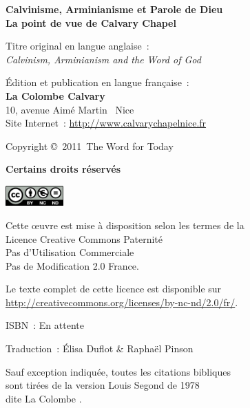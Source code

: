 \newpage
\mbox{}
\vfill

{\scriptsize

{\bfseries Calvinisme, Arminianisme et Parole de Dieu\\
La point de vue de Calvary Chapel}

Titre original en langue anglaise~:\\
\emph{Calvinism, Arminianism and the Word of God}

Édition et publication en langue française~:\\
{\bfseries La Colombe Calvary}\\
10, avenue Aimé Martin ~Nice\\
Site Internet~: \url{http://www.calvarychapelnice.fr}

Copyright \copyright{}~2011~The Word for Today

{\bfseries Certains droits réservés}

\includegraphics[width=6em]{by-nc-nd_eu}

Cette \oe{}uvre est mise à disposition selon les termes de la \\
 Licence Creative Commons Paternité \\
 \ocadr Pas d'Utilisation Commerciale \\
 \ocadr Pas de Modification 2.0 France.

Le texte complet de cette licence est disponible sur \\
 \url{http://creativecommons.org/licenses/by-nc-nd/2.0/fr/}.

ISBN~: En attente

Traduction~: Élisa Duflot \& Raphaël Pinson

Sauf exception indiquée, toutes les citations bibliques \\
 sont tirées de la version Louis Segond de 1978 \\ dite \og La Colombe \fg{}.

}
\enlargethispage{\footskip}

